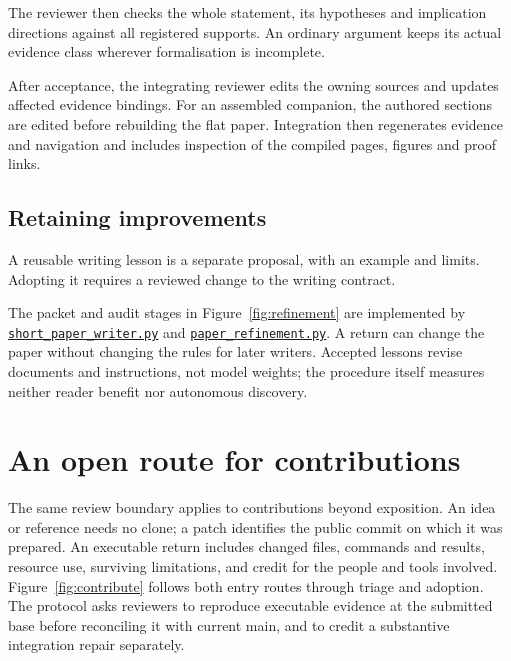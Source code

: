 \documentclass[10pt]{article}
\newcommand{\repobase}{https://github.com/wcook04/plectis-erdos}
\newcommand{\repolink}[2]{\href{\repobase/blob/992cf60a27efd8c34f437e347c413bb781d75c32/#1}{\texttt{#2}}}
\begin{document}
The reviewer then checks the whole statement, its hypotheses and implication directions against all registered supports. An ordinary argument keeps its actual evidence class wherever formalisation is incomplete.

After acceptance, the integrating reviewer edits the owning sources and updates affected evidence bindings. For an assembled companion, the authored sections are edited before rebuilding the flat paper. Integration then regenerates evidence and navigation and includes inspection of the compiled pages, figures and proof links.

\subsection{Retaining improvements}

A reusable writing lesson is a separate proposal, with an example and limits. Adopting it requires a reviewed change to the writing contract.

The packet and audit stages in Figure~\ref{fig:refinement} are implemented by \repolink{scripts/short_paper_writer.py}{short\_paper\_writer.py} and \repolink{scripts/paper_refinement.py}{paper\_refinement.py}. A return can change the paper without changing the rules for later writers. Accepted lessons revise documents and instructions, not model weights; the procedure itself measures neither reader benefit nor autonomous discovery.

\section{An open route for contributions}\label{sec:contribute}\label{sec:loop}\label{sec:cycle}
The same review boundary applies to contributions beyond exposition. An idea or reference needs no clone; a patch identifies the public commit on which it was prepared.
An executable return includes changed files, commands and results, resource use, surviving limitations, and credit for the people and tools involved.
Figure~\ref{fig:contribute} follows both entry routes through triage and adoption.
The protocol asks reviewers to reproduce executable evidence at the submitted base before reconciling it with current main, and to credit a substantive integration repair separately.
\end{document}
